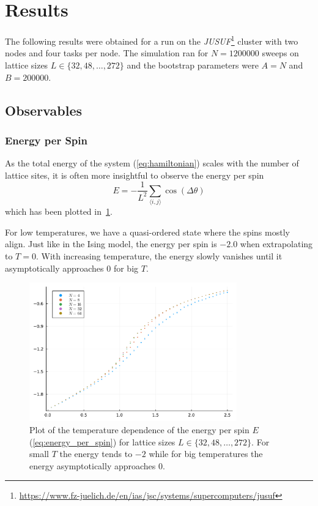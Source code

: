 \section{Results}
The following results were obtained for a run on the \textit{JUSUF}\footnote{\url{https://www.fz-juelich.de/en/ias/jsc/systems/supercomputers/jusuf}} cluster with two nodes and four tasks per node. The simulation ran for $N = \num{1 200 000}$ sweeps on lattice sizes $L\in\{32, 48, \dots, 272\}$ and the bootstrap parameters were $A = N$ and $B = \num{200 000}$.

\subsection{Observables}\label{sec:observables}
\subsubsection{Energy per Spin}\label{sec:energy_per_spin}
As the total energy of the system (\cref{eq:hamiltonian}) scales with the number of lattice sites, it is often more insightful to observe the energy per spin
\begin{equation}\label{eq:energy_per_spin}
	E = - \frac{1}{L^2} \sum_{\langle i,j \rangle}{\cos{(\Delta \theta)}}
\end{equation}
which has been plotted in~\cref{fig:energy_per_spin}.

For low temperatures, we have a quasi-ordered state where the spins mostly align. Just like in the Ising model, the energy per spin is $-2.0$ when extrapolating to $T=0$. With increasing temperature, the energy slowly vanishes until it asymptotically approaches $0$ for big $T$.
\begin{figure}[ht]
	\centering
	\includegraphics[width=0.8\textwidth]{Energy.pdf}
	\caption[Temperature dependence of the energy per spin $E$]{Plot of the temperature dependence of the energy per spin $E$ (\cref{eq:energy_per_spin}) for lattice sizes $L\in\{32, 48, \dots, 272\}$. For small $T$ the energy tends to $\num{-2}$ while for big temperatures the energy asymptotically approaches $\num{0}$.}
	\label{fig:energy_per_spin}
\end{figure}


